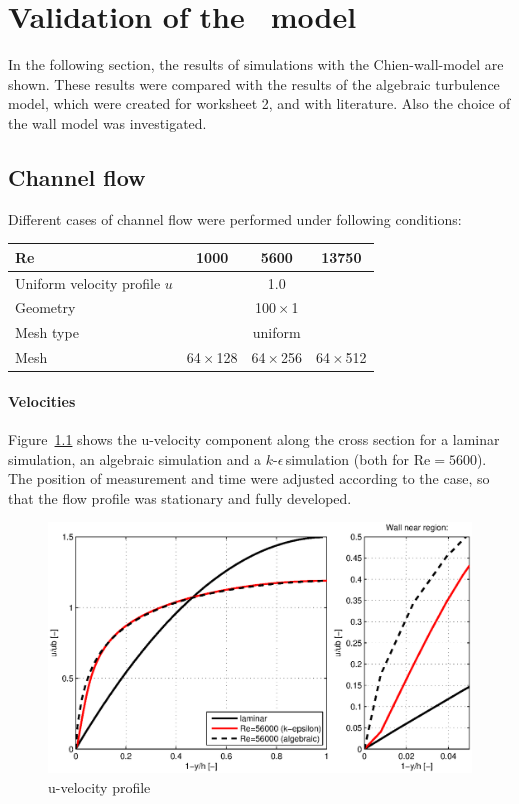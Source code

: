 \chapter{Validation of the \ke\, model} %
\label{cha:validation_of_k_epsilon_model}

In the following section, the results of simulations with the Chien-wall-model are shown. These results were compared with the results of the algebraic turbulence model, which were created for worksheet 2, and with literature. Also the choice of the wall model was investigated.

\section{Channel flow} %
\label{sec:channel_flow}

Different cases of channel flow were performed under following conditions:

\begin{center}
\begin{tabular}{lccc}
\hline 
Re        & 1000 & 5600 & 13750\\\hline         
Uniform velocity profile $u$         & \multicolumn{3}{c}{1.0}\\
Geometry  & \multicolumn{3}{c}{100\,$\times$\,1} \\
Mesh type & \multicolumn{3}{c}{uniform} \\
Mesh      & 64\,$\times$\,128 & 64\,$\times$\,256 & 64\,$\times$\,512 \\\hline 
\end{tabular}
\end{center}


\subsubsection*{Velocities}
Figure~\ref{fig:channel-u-profile} shows the u-velocity component along the cross section for a laminar simulation, an algebraic simulation and a $k$-$\epsilon$\,simulation (both for Re$=5600$). The position of measurement and time were adjusted according to the case, so that the flow profile was stationary and fully developed.

\begin{figure}[!htb]
\centering
\includegraphics[width=1.0\textwidth]{FIGURES/vprofile.eps}
\caption{u-velocity profile}
\label{fig:channel-u-profile}
\end{figure} 


